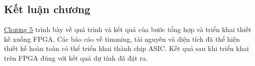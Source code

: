 \subsection{Kết luận chương}

\hyperref[chuong5]{Chương 5} trình bày về quá trình và kết quả của bước tổng hợp và triển khai thiết kế xuống FPGA. Các báo cáo về timming, tài nguyên và diện tích đã thể  hiện thiết kế  hoàn toàn có thể  triển khai thành chip ASIC. Kết quả sau khi triển khai trên FPGA đúng với kết quả dự tính đã đặt ra.
\newpage